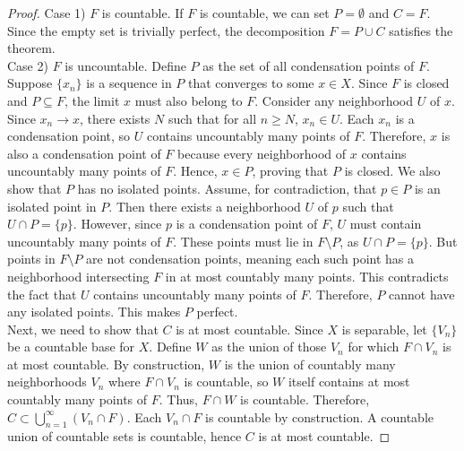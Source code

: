 \documentclass[12pt]{article}
\begin{document}
\begin{exercise}{28}
    \begin{proof}
        Case 1) $F$ is countable. If \( F \) is countable, we can set \( P = \emptyset \) and \( C = F \). Since the empty set is trivially perfect, the decomposition \( F = P \cup C \) satisfies the theorem. \\
        Case 2) \( F \) is uncountable. Define \( P \) as the set of all condensation points of \( F \). Suppose \( \{x_n\} \) is a sequence in \( P \) that converges to some \( x \in X \). Since \( F \) is closed and \( P \subseteq F \), the limit \( x \) must also belong to \( F \). Consider any neighborhood \( U \) of \( x \). Since \( x_n \to x \), there exists \( N \) such that for all \( n \geq N \), \( x_n \in U \). Each \( x_n \) is a condensation point, so \( U \) contains uncountably many points of \( F \). Therefore, \( x \) is also a condensation point of \( F \) because every neighborhood of \( x \) contains uncountably many points of \( F \). Hence, \( x \in P \), proving that \( P \) is closed. We also show that $P$ has no isolated points. Assume, for contradiction, that \( p \in P \) is an isolated point in \( P \). Then there exists a neighborhood \( U \) of \( p \) such that \( U \cap P = \{p\} \). However, since \( p \) is a condensation point of \( F \), \( U \) must contain uncountably many points of \( F \). These points must lie in \( F \setminus P \), as \( U \cap P = \{p\} \). But points in \( F \setminus P \) are not condensation points, meaning each such point has a neighborhood intersecting \( F \) in at most countably many points. This contradicts the fact that \( U \) contains uncountably many points of \( F \). Therefore, \( P \) cannot have any isolated points. This makes $P$ perfect. \\
        Next, we need to show that $C$ is at most countable. Since $X$ is separable, let $\{ V_n \}$ be a countable base for $X$. Define $W$ as the union of those $V_n$ for which $F \cap V_n$ is at most countable. By construction, $W$ is the union of countably many neighborhoods $V_n$ where $F \cap V_n$ is countable, so $W$ itself contains at most countably many points of $F$. Thus, $F \cap W$ is countable. Therefore, $C \subset \bigcup_{n = 1}^\infty (V_n \cap F)$. Each $V_n \cap F$ is countable by construction. A countable union of countable sets is countable, hence $C$ is at most countable. 
    \end{proof}
\end{exercise}
\end{document}
